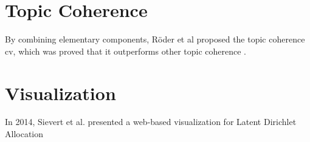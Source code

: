 \documentclass{article} %
\begin{document}
\section{Topic Coherence}
By combining elementary components, Röder et al proposed the topic coherence c\textunderscore{}v, which was proved that it outperforms other topic coherence \cite{roder_exploring_2015}. 

\section{Visualization}
In 2014, Sievert et al. presented a web-based visualization for Latent Dirichlet Allocation \cite{sievert_ldavis:_2014}





\end{document}
